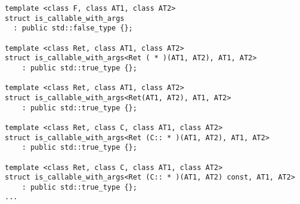 \begin{lstlisting}[mathescape]
template <class F, class AT1, class AT2>
struct is_callable_with_args
  : public std::false_type {};

template <class Ret, class AT1, class AT2>
struct is_callable_with_args<Ret ( * )(AT1, AT2), AT1, AT2>
    : public std::true_type {};

template <class Ret, class AT1, class AT2>
struct is_callable_with_args<Ret(AT1, AT2), AT1, AT2>
    : public std::true_type {};

template <class Ret, class C, class AT1, class AT2>
struct is_callable_with_args<Ret (C:: * )(AT1, AT2), AT1, AT2>
    : public std::true_type {};

template <class Ret, class C, class AT1, class AT2>
struct is_callable_with_args<Ret (C:: * )(AT1, AT2) const, AT1, AT2>
    : public std::true_type {};
...
\end{lstlisting}
